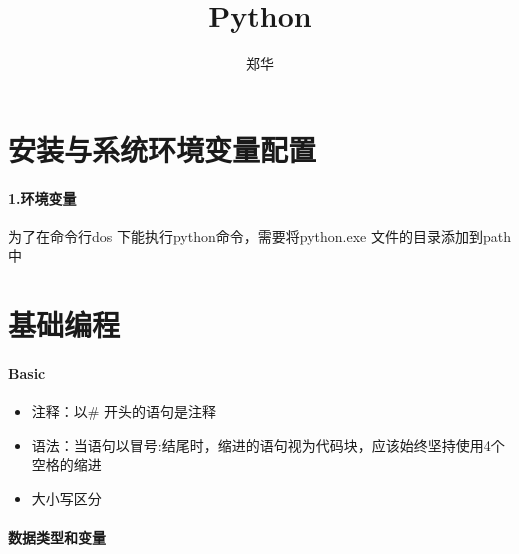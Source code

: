 \documentclass[UTF8,a4paper,8pt]{ctexart}
\author{\kaishu 郑华}
\title{\heiti Python }
\begin{document}
 	\maketitle
  
  \newpage
  \section{安装与系统环境变量配置}
	  \paragraph{1.环境变量}为了在命令行dos 下能执行python命令，需要将python.exe 文件的目录添加到path 中
  
  \newpage
  \section{基础编程}
	  \paragraph{Basic}
		  \begin{itemize}
			  	\item 注释：以\# 开头的语句是注释
			  	\item 语法：当语句以冒号:结尾时，缩进的语句视为代码块，应该始终坚持使用4个空格的缩进
			  	\item 大小写区分
		  \end{itemize}
	  
	  \paragraph{数据类型和变量}
	  
\end{document}
